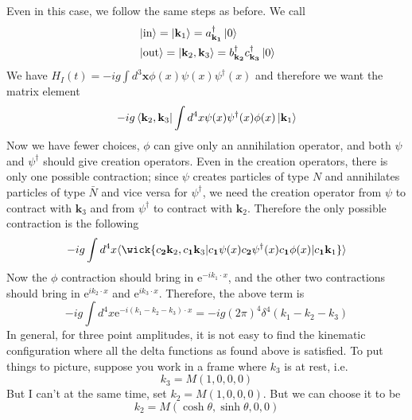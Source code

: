 \documentclass[11pt, notitlepage]{report}
\newcommand{\e}{\mathrm{e}}
\newcommand{\adag}[1]{a^\dagger_\mathbf{#1}}
\newcommand{\bdag}[1]{b^\dagger_\mathbf{#1}}
\renewcommand{\c}[1]{c_\mathbf{#1}}
\newcommand{\cdag}[1]{c^\dagger_\mathbf{#1}}
\numberwithin{equation}{section}
\begin{document}
    Even in this case, we follow the same steps as before. We call
    \begin{align*}
        &\ket{\text{in}} = \ket{\textbf{k}_1} = \adag{k_1}\ket{0}\\
        &\ket{\text{out}} = \ket{\textbf{k}_2, \textbf{k}_3} = \bdag{k_2}\cdag{k_3}\ket{0}
    \end{align*} 
    We have \(H_I(t) = -ig\int d^3\textbf{x} \phi(x) \psi(x) \psi^\dagger(x)\) and therefore we want the matrix element 
    \begin{equation*}
        -ig \bra{\textbf{k}_2, \textbf{k}_3} \int d^4x  \psi(x) \psi^\dagger(x) \phi(x) \ket{\textbf{k}_1} 
    \end{equation*}
    Now we have fewer choices, \(\phi\) can give only an annihilation operator, and both \(\psi\) and \(\psi^\dagger\) should give creation operators. Even in the creation operators, there is only one possible contraction; since \(\psi\) creates particles of type \(N\) and annihilates particles of type \(\bar{N}\) and vice versa for \(\psi^\dagger\), we need the creation operator from \(\psi\) to contract with \(\textbf{k}_3\) and from \(\psi^\dagger\) to contract with \(\textbf{k}_2\). Therefore the only possible contraction is the following 
    \begin{equation*}
        -ig \int d^4x \langle \wick{\c2{\mathbf{k}_2},\c1{\mathbf{k}_3}| \c1 \psi(x) \c2 \psi^\dagger(x) \c1 \phi(x) | \c1{\mathbf{k}_1}}\rangle 
    \end{equation*}
    Now the \(\phi\) contraction should bring in \(\e^{-ik_1\cdot x}\), and the other two contractions should bring in \(\e^{ik_2\cdot x}\) and \(\e^{ik_3\cdot x}\). Therefore, the above term is 
    \begin{equation*}
        -ig \int d^4 x \e^{-i(k_1 - k_2 - k_3)\cdot x} = -ig(2\pi)^4 \delta^4(k_1 - k_2 - k_3)
    \end{equation*}
    In general, for three point amplitudes, it is not easy to find the kinematic configuration where all the delta functions as found above is satisfied. To put things to picture, suppose you work in a frame where \(k_3\) is at rest, i.e. 
    \begin{equation*}
        k_3 = M(1,0,0,0)
    \end{equation*}
    But I can't at the same time, set \(k_2 = M(1,0,0,0)\). But we can choose it to be 
    \begin{equation*}
        k_2 = M(\cosh\theta, \sinh\theta, 0, 0)
    \end{equation*} 
\end{document}
